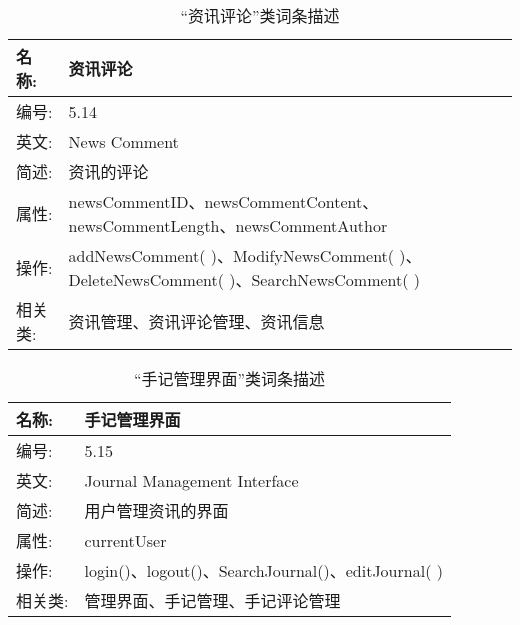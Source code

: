 \begin{table}[H]  
\caption{“资讯评论”类词条描述}  
\begin{center}  
    \begin{tabular}{l p{11cm}} 
        \hline
        \quad 名称:  & 资讯评论 \\
        \hline
        \quad 编号:  & 5.14 \\
        \hline
        \quad 英文:  &  News Comment\\
        \hline
        \quad 简述:  & 资讯的评论 \\
        \hline
        \quad 属性:  & newsCommentID、newsCommentContent、newsCommentLength、newsCommentAuthor\\
        \hline
        \quad 操作:  & addNewsComment( )、ModifyNewsComment( )、DeleteNewsComment( )、SearchNewsComment( ) \\
        \hline
        \quad 相关类: & 资讯管理、资讯评论管理、资讯信息\\
        \hline
    \end{tabular}
\end{center}
\end{table}


\begin{table}[H]  
\caption{“手记管理界面”类词条描述}  
\begin{center}  
    \begin{tabular}{l p{11cm}} 
        \hline
        \quad 名称:  & 手记管理界面 \\
        \hline
        \quad 编号:  & 5.15 \\
        \hline
        \quad 英文:  &  Journal Management Interface \\
        \hline
        \quad 简述:  & 用户管理资讯的界面 \\
        \hline
        \quad 属性:  & currentUser \\
        \hline
        \quad 操作:  & login()、logout()、SearchJournal()、editJournal( )\\
        \hline
        \quad 相关类: & 管理界面、手记管理、手记评论管理\\
        \hline
    \end{tabular}
\end{center}
\end{table}

